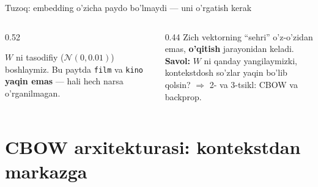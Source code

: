 \documentclass[aspectratio=169,11pt]{beamer}
\begin{document}
\begin{frame}{Tuzoq: embedding o'zicha paydo bo'lmaydi --- uni o'rgatish kerak}
  \begin{columns}[T]
    \begin{column}{0.52\textwidth}
      \begin{tcolorbox}[warnbox,title=Tasodifiy boshlang'ich vektor ma'nosiz]
        \small
        $W$ ni tasodifiy ($\mathcal{N}(0,0.01)$) boshlaymiz. Bu paytda
        \texttt{film} va \texttt{kino} \textbf{yaqin emas} --- hali hech narsa
        o'rganilmagan.
      \end{tcolorbox}
    \end{column}
    \begin{column}{0.44\textwidth}
      \footnotesize
      Zich vektorning ``sehri'' o'z-o'zidan emas, \textbf{o'qitish} jarayonidan
      keladi.\\[4pt]
      \textbf{Savol:} $W$ ni qanday yangilaymizki, kontekstdosh so'zlar yaqin
      bo'lib qolsin? $\Rightarrow$ 2- va 3-tsikl: CBOW va backprop.
    \end{column}
  \end{columns}
\end{frame}

\section[CBOW]{CBOW arxitekturasi: kontekstdan markazga}
\end{document}
